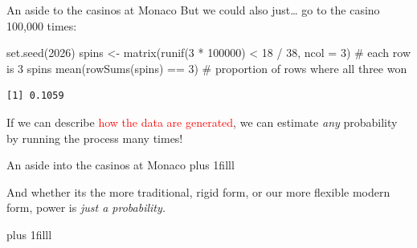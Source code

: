 \documentclass[
  ignorenonframetext,
  aspectratio=169,
]{beamer}
\newenvironment{Shaded}{\begin{snugshade}}{\end{snugshade}}
\newcommand{\AttributeTok}[1]{\textcolor[rgb]{0.40,0.45,0.13}{#1}}
\newcommand{\CommentTok}[1]{\textcolor[rgb]{0.37,0.37,0.37}{#1}}
\newcommand{\DecValTok}[1]{\textcolor[rgb]{0.68,0.00,0.00}{#1}}
\newcommand{\FunctionTok}[1]{\textcolor[rgb]{0.28,0.35,0.67}{#1}}
\newcommand{\NormalTok}[1]{\textcolor[rgb]{0.00,0.23,0.31}{#1}}
\newcommand{\OtherTok}[1]{\textcolor[rgb]{0.00,0.23,0.31}{#1}}
\newcommand{\SpecialCharTok}[1]{\textcolor[rgb]{0.37,0.37,0.37}{#1}}
\begin{document}
\begin{frame}[fragile]{An aside to the casinos at Monaco}
\label{an-aside-to-the-casinos-at-monaco}
But we could also just\ldots{} go to the casino 100,000 times:

\begin{Shaded}
\begin{Highlighting}[]
\FunctionTok{set.seed}\NormalTok{(}\DecValTok{2026}\NormalTok{)}
\NormalTok{spins }\OtherTok{\textless{}{-}} \FunctionTok{matrix}\NormalTok{(}\FunctionTok{runif}\NormalTok{(}\DecValTok{3} \SpecialCharTok{*} \DecValTok{100000}\NormalTok{) }\SpecialCharTok{\textless{}} \DecValTok{18} \SpecialCharTok{/} \DecValTok{38}\NormalTok{, }\AttributeTok{ncol =} \DecValTok{3}\NormalTok{) }\CommentTok{\# each row is 3 spins}
\FunctionTok{mean}\NormalTok{(}\FunctionTok{rowSums}\NormalTok{(spins) }\SpecialCharTok{==} \DecValTok{3}\NormalTok{) }\CommentTok{\# proportion of rows where all three won}
\end{Highlighting}
\end{Shaded}

\begin{verbatim}
[1] 0.1059
\end{verbatim}

\begin{center}
If we can describe \textcolor{red}{how the data are generated}, we can estimate \textit{any} probability by running the process many times!
\end{center}
\end{frame}

\begin{frame}{An aside into the casinos at Monaco}
\label{an-aside-into-the-casinos-at-monaco-2}
\vskip0pt plus 1filll

\begin{center}
\Large
And whether its the more traditional, rigid form, or our more flexible modern form, power is \textit{just a probability.}
\end{center}

\vskip0pt plus 1filll
\end{frame}
\end{document}
